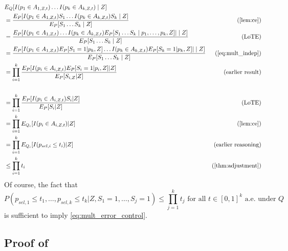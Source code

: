 \documentclass{article}
\begin{document}
\begin{appendix}
\begin{align*}
    &E_Q[ I(p_1 \in A_{1, Z, t}) \dots I(p_k \in A_{k, Z, t}) \mid Z] \\
    &= \frac{E_P[ I(p_1 \in A_{1, Z, t})S_1 \dots I(p_k \in A_{k, Z, t})S_k \mid Z] }{E_P[ S_1\dots S_k \mid Z]} & \text{(\Cref{lem:ce})}\\
    &= \frac{E_P[I(p_1 \in A_{1, Z, t}) \dots I(p_k \in A_{k, Z, t}) E_P[ S_1\dots S_k \mid p_1, \dots, p_k, Z] | \mid Z ]  }{E_P[ S_1\dots S_k \mid Z]}  & \text{(LoTE)}\\
    &= \frac{E_P[I(p_1 \in A_{1, Z, t}) E_P[S_1= 1 | p_k, Z] \dots I(p_k \in A_{k, Z, t}) E_P[S_k= 1 | p_k, Z]  | \mid Z ]  }{E_P[ S_1\dots S_k \mid Z]} & \text{(\Cref{eq:mult_indep})}\\
    &= \prod_{i=1}^k \frac{E_P[ I(p_i \in A_{i, Z, t}) E_P[S_i= 1 | p_i, Z]| Z]}{E_P[S_{i, Z} | Z]} & \text{(earlier result)}\\\\
    &= \prod_{i=1}^k \frac{E_P[ I(p_i \in A_{i, Z, t})S_i| Z]}{E_P[S_i | Z]} & \text{(LoTE)} \\
    &=  \prod_{i=1}^k E_{Q_i}[I(p_i \in A_{i, Z, t})| Z] & \text{(\Cref{lem:ce})}\\
    &= \prod_{i=1}^k E_{Q_i}[I(p_{sel, i} \leq t_i)| Z] & \text{(earlier reasoning)}\\
    &\leq \prod_{i=1}^k t_i & \text{(\Cref{thm:adjustment})}
\end{align*}
Of course, the fact that 
\begin{equation*}
    P(p_{sel, 1} \leq t_1, \dots, p_{sel, k} \leq t_k | Z, S_1=1, \dots, S_j=1) \leq \prod_{j=1}^k t_j \text{ for all } t \in [0,1 ]^k  \text{ a.e. under } Q 
\end{equation*}
is sufficient to imply \eqref{eq:mult_error_control}. 

\subsection{Proof of }


\end{appendix}
\end{document}

